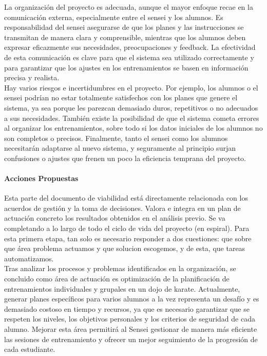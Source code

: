 \documentclass[12pt,a4paper,twoside,spanish]{article}      %
\begin{document}
       La organización del proyecto es adecuada, aunque el mayor enfoque recae en la comunicación externa, 
       especialmente entre el sensei y los alumnos. Es responsabilidad del sensei asegurarse de que los planes 
       y las instrucciones se transmitan de manera clara y comprensible, mientras que los alumnos deben expresar 
       eficazmente sus necesidades, preocupaciones y feedback. La efectividad de esta comunicación es clave para 
       que el sistema sea utilizado correctamente y para garantizar que los ajustes en los entrenamientos se basen 
       en información precisa y realista.
       \\
       Hay varios riesgos e incertidumbres en el proyecto. Por ejemplo, los alumnos o el sensei podrían no estar 
       totalmente satisfechos con los planes que genere el sistema, ya sea porque les parezcan demasiado duros, 
       repetitivos o no adecuados a sus necesidades. También existe la posibilidad de que el sistema cometa errores 
       al organizar los entrenamientos, sobre todo si los datos iniciales de los alumnos no son completos o precisos. 
       Finalmente, tanto el sensei como los alumnos necesitarán adaptarse al nuevo sistema, y seguramente al principio 
       surjan confusiones o ajustes que frenen un poco la eficiencia temprana del proyecto.

       \paragraph{Acciones Propuestas}


       Esta parte del documento de viabilidad está directamente relacionada con los acuerdos
       de gestión y la toma de decisiones. Valora e integra en un plan de actuación concreto los
       resultados obtenidos en el análisis previo. Se va completando a lo largo de todo el ciclo de
       vida del proyecto (en espiral). Para esta primera etapa, tan solo es necesario responder a
       dos cuestiones: que sobre que área problema actuamos y que solucion escogemos, y de esta, que tareas automatizamos.\\
       
       Tras analizar los procesos y problemas identificados en la organización, se concluido como área de actuación es optimización de la planificación 
       de entrenamientos individuales y grupales en un dojo de karate. Actualmente, generar planes específicos para varios alumnos a la vez representa un 
       desafío y es demasiado costoso en tiempo y recursos, ya que es necesario garantizar que se respeten los niveles, los objetivos personales y los 
       criterios de seguridad de cada alumno. Mejorar esta área permitirá al Sensei gestionar de manera más eficiente las sesiones de entrenamiento y 
       ofrecer un mejor seguimiento de la progresión de cada estudiante.\\
       
\end{document}
